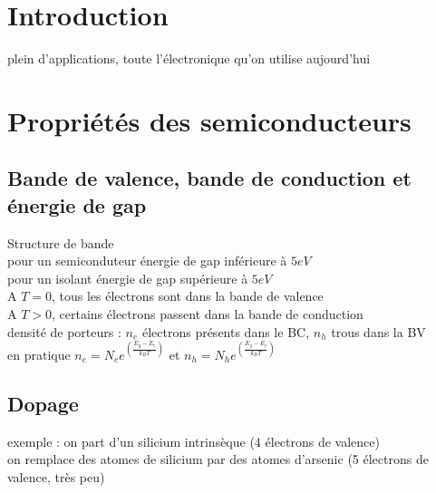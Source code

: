 


\biblio{}

\section*{Introduction}
plein d'applications, toute l'électronique qu'on utilise aujourd'hui \\


\section{Propriétés des semiconducteurs}
\subsection{Bande de valence, bande de conduction et énergie de gap}
Structure de bande \\
pour un semiconduteur énergie de gap inférieure à $5eV$ \\
pour un isolant énergie de gap supérieure à $5eV$ \\
A $T=0$, tous les électrons sont dans la bande de valence \\
A $T>0$, certains électrons passent dans la bande de conduction \\
densité de porteurs : $n_e$ électrons présents dans le BC, $n_h$ trous dans la BV \\
en pratique $n_e=N_e e^{\left( \frac{E_g-E_c}{k_B T}\right)}$  et  $n_h=N_ h e^{\left( \frac{E_g-E_c}{k_B T}\right)}$ \\


\subsection{Dopage}
exemple : on part d'un silicium intrinsèque (4 électrons de valence) \\
on remplace des atomes de silicium par des atomes d'arsenic (5 électrons de valence, très peu)  \\

